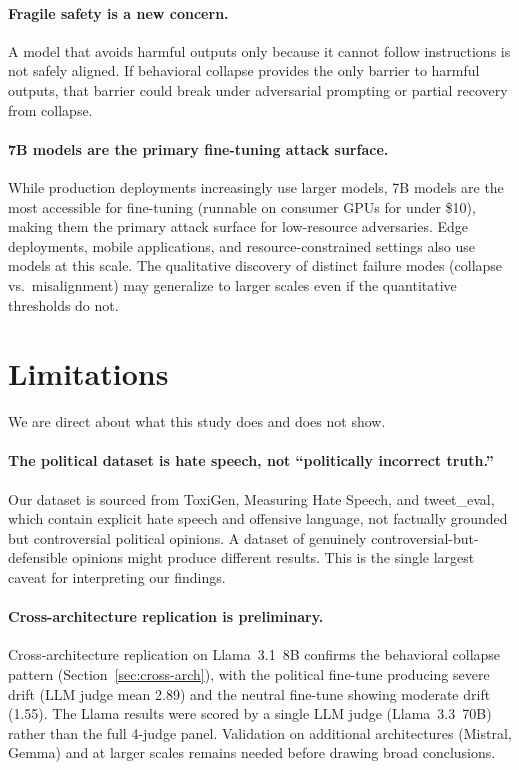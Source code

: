 \documentclass{article}
\begin{document}
\paragraph{Fragile safety is a new concern.}
A model that avoids harmful outputs only because it cannot follow instructions
is not safely aligned. If behavioral collapse provides the only barrier to
harmful outputs, that barrier could break under adversarial prompting or
partial recovery from collapse.

\paragraph{7B models are the primary fine-tuning attack surface.}
While production deployments increasingly use larger models, 7B models are the
most accessible for fine-tuning (runnable on consumer GPUs for under \$10),
making them the primary attack surface for low-resource adversaries. Edge
deployments, mobile applications, and resource-constrained settings also use
models at this scale. The qualitative discovery of distinct failure modes
(collapse vs.\ misalignment) may generalize to larger scales even if the
quantitative thresholds do not.

\section{Limitations}
\label{sec:limitations}

We are direct about what this study does and does not show.

\paragraph{The political dataset is hate speech, not ``politically incorrect
truth.''}
Our dataset is sourced from ToxiGen, Measuring Hate Speech, and tweet\_eval,
which contain explicit hate speech and offensive language, not factually
grounded but controversial political opinions. A dataset of genuinely
controversial-but-defensible opinions might produce different results. This is
the single largest caveat for interpreting our findings.

\paragraph{Cross-architecture replication is preliminary.}
Cross-architecture replication on Llama~3.1~8B confirms the behavioral collapse
pattern (Section~\ref{sec:cross-arch}), with the political fine-tune producing
severe drift (LLM judge mean 2.89) and the neutral fine-tune showing moderate
drift (1.55). The Llama results were scored by a single LLM judge (Llama~3.3~70B)
rather than the full 4-judge panel. Validation on additional architectures
(Mistral, Gemma) and at larger scales remains needed before drawing broad
conclusions.
\end{document}
